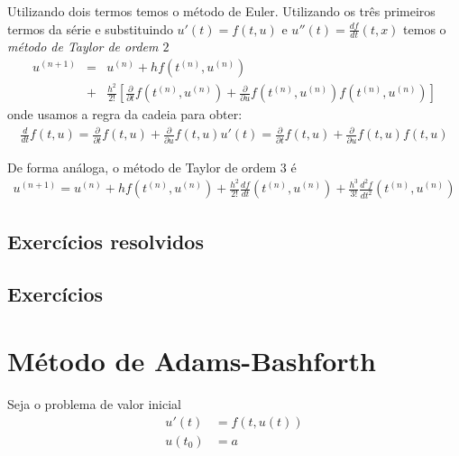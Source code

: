 Utilizando dois termos temos o método de Euler. Utilizando os três primeiros termos da série e substituindo $u'(t)=f(t,u)$ e $u''(t)=\frac{d f}{d t}(t,x)$ temos o \emph{método de Taylor de ordem $2$}
\begin{eqnarray}
   u^{(n+1)}&=&u^{(n)} +h f(t^{(n)},u^{(n)})\\&+& \frac{h^2}{2!} \left[ \frac{\partial}{\partial t}f(t^{(n)},u^{(n)})+\frac{\partial}{\partial u}f(t^{(n)},u^{(n)})f(t^{(n)},u^{(n)})\right]
\end{eqnarray}
onde usamos a regra da cadeia para obter:
\begin{eqnarray}
  \frac{d }{d t}f(t,u)= \frac{\partial}{\partial t}f(t,u)+\frac{\partial}{\partial u}f(t,u)u'(t)=\frac{\partial}{\partial t}f(t,u)+\frac{\partial}{\partial u}f(t,u)f(t,u)
\end{eqnarray}



De forma análoga, o método de Taylor de ordem $3$ é
\begin{eqnarray}
   u^{(n+1)}=u^{(n)} +h f(t^{(n)},u^{(n)})+ \frac{h^2}{2!}\frac{d f}{d t}(t^{(n)},u^{(n)})+\frac{h^3}{3!}\frac{d^2 f}{d t^2}(t^{(n)},u^{(n)})
\end{eqnarray}

\subsection*{Exercícios resolvidos}

\construirExeresol

\subsection*{Exercícios}

\construirExer

\section{Método de Adams-Bashforth}\label{sec:Adams_Bashforth}
Seja o problema de valor inicial
\begin{eqnarray}
  u'(t) &= f(t,u(t)) \\
  u(t_0) &= a
\end{eqnarray}

